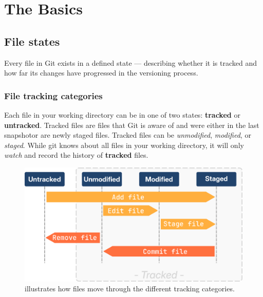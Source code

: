 \chapter{The Basics}
\chapteroverlay
\section{File states}
Every file in Git exists in a defined state — describing whether it is tracked and how far its changes have progressed in the versioning process.

\subsection{File tracking categories}
Each file in your working directory can be in one of two states: \textbf{tracked} or \textbf{untracked}. Tracked files are files that Git is aware of and were either in the last snapshot\footnotemark[1] or are newly staged files.
Tracked files can be \textit{unmodified}, \textit{modified}, or \textit{staged}. \newline
While git knows about all files in your working directory, it will only \textit{watch} and record the history of \textbf{tracked} files.

\begin{figure}[H]
\centering
    \centering
    \includegraphics[scale=1]{Images/workingTree_tracked.png}
    \caption{illustrates how files move through the different tracking categories.}
\end{figure}

